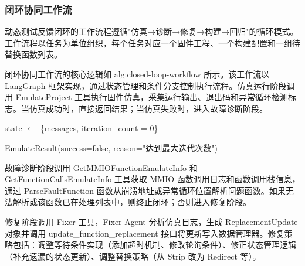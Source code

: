 \subsubsection{闭环协同工作流}

动态测试反馈闭环的工作流程遵循"仿真→诊断→修复→构建→回归"的循环模式。工作流程以任务为单位组织，每个任务对应一个固件工程、一个构建配置和一组待替换函数列表。

闭环协同工作流的核心逻辑如 {alg:closed-loop-workflow} 所示。该工作流以 LangGraph 框架实现，通过状态管理和条件分支控制执行流程。仿真运行阶段调用 EmulateProject 工具执行固件仿真，采集运行输出、退出码和异常循环检测标志。当仿真成功时，直接返回结果；当仿真失败时，进入故障诊断阶段。


\begin{algorithm}[htbp]
\caption{闭环协同工作流核心逻辑}
\label{alg:closed-loop-workflow}
\small
{}

state $\leftarrow$ \{messages, iteration\_count = 0\}\;

\Return EmulateResult(success=false, reason="达到最大迭代次数")\;
\end{algorithm}

故障诊断阶段调用 GetMMIOFunctionEmulateInfo 和 GetFunctionCallsEmulateInfo 工具获取 MMIO 函数调用日志和函数调用栈信息，通过 ParseFaultFunction 函数从崩溃地址或异常循环位置解析问题函数。如果无法解析或该函数已在处理列表中，则终止闭环；否则进入修复阶段。

修复阶段调用 Fixer 工具，Fixer Agent 分析仿真日志，生成 ReplacementUpdate 对象并调用 update\_function\_replacement 接口将更新写入数据管理器。修复策略包括：调整等待条件实现（添加超时机制、修改轮询条件）、修正状态管理逻辑（补充遗漏的状态更新）、调整替换策略（从 Strip 改为 Redirect 等）。

